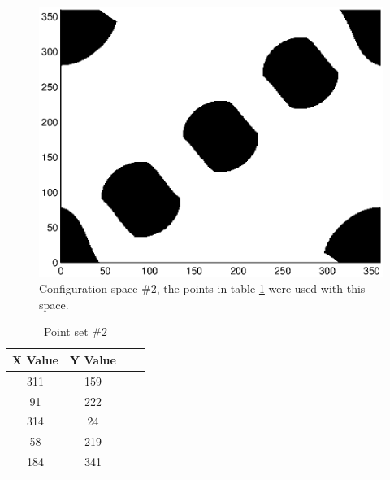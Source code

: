 \begin{figure}[h]
	\centering
	\includegraphics[width=\figWidth]{./figures/cspace3.eps}
	\caption{Configuration space \#2, the points in table \ref{tbl:pts2} were used with this space.}
	\label{fig:space2}
\end{figure}

\begin{table} [h]
\renewcommand{\arraystretch}{1.4}
	\caption{Point set \#2}
\label{tbl:pts2}
\begin{center}
		\begin{tabular}{ c | c  c  p{1.8cm} }
				X Value & Y Value \\ \hline
   311 &  159 \\
    91  & 222\\
   314   & 24\\
    58  & 219\\
   184  & 341\\
\end{tabular}
\end{center}
\end{table}

